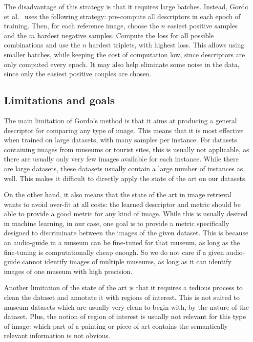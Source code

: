 The disadvantage of this strategy is that it requires large batches.
Instead, Gordo et al.~\cite{gordo_end--end_2016} uses the following
strategy: pre-compute all descriptors in each epoch of training.
Then, for each reference image, choose the $n$ easiest positive samples
and the $m$ hardest negative samples. Compute the loss for all possible
combinations and use the $n$ hardest triplets, with highest loss.
This allows using smaller batches, while keeping the cost of computation
low, since descriptors are only computed every epoch. It may also help
eliminate some noise in the data, since only the easiest positive couples
are chosen.

\subsection{Limitations and goals}\label{sec:limitations}
The main limitation of Gordo's method is that it aims at producing a
general descriptor for comparing any type of image. This means that it
is most effective when trained on large datasets, with many samples
per instance. For datasets containing images from museums or tourist
sites, this is usually not applicable, as there are usually only very few
images available for each instance. While there are large datasets,
these datasets usually contain a large number of instances as well.
This makes it difficult to directly apply the state of the art on
our datasets.

On the other hand, it also means that the state of the art in
image retrieval wants to avoid over-fit at all costs:
the learned descriptor and metric should
be able to provide a good metric for any kind of image.
While this is usually desired in machine learning, in our case,
one goal is to provide a metric specifically designed
to discriminate between the images of the given dataset. This is because
an audio-guide in a museum can be fine-tuned for that museum, as long
as the fine-tuning is computationally cheap enough. So we do not care
if a given audio-guide cannot identify images of multiple museums,
as long as it can identify images of one museum with high precision.

Another limitation of the state of the art is that it requires
a tedious process to clean the dataset and annotate it with regions of
interest. This is not suited to museum datasets which are usually very
clean to begin with, by the nature of the dataset. Plus, the notion of
region of interest is usually not relevant for this type of image:
which part of a painting or piece of art contains the semantically
relevant information is not obvious.

